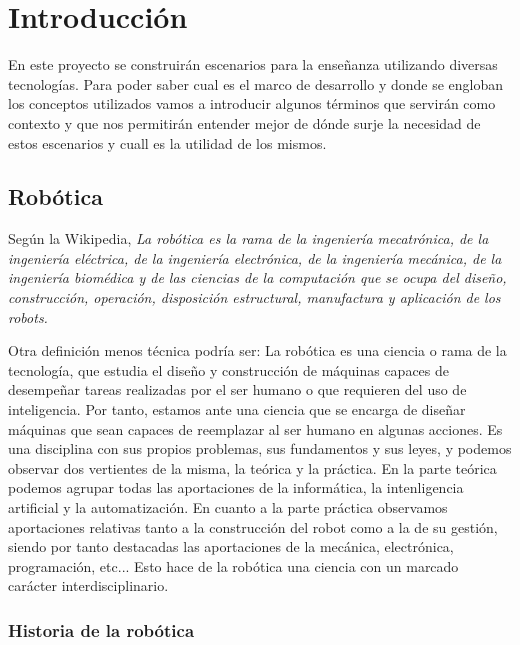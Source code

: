 \chapter{Introducción}
\label{ch:Introduccion}

En este proyecto se construirán escenarios para la enseñanza utilizando diversas tecnologías. Para poder saber cual es el marco de desarrollo y donde se engloban los conceptos utilizados vamos a introducir algunos términos que servirán como contexto y que nos permitirán entender mejor de dónde surje la necesidad de estos escenarios y cuall es la utilidad de los mismos.

\section{Robótica}
\label{sec:intr_robotica}

Según la Wikipedia\cite{wikipedia}, \textit{La robótica es la rama de la ingeniería mecatrónica, de la ingeniería eléctrica, de la ingeniería electrónica, de la ingeniería mecánica, de la ingeniería biomédica y de las ciencias de la computación que se ocupa del diseño, construcción, operación, disposición estructural, manufactura y aplicación de los robots.}

Otra definición menos técnica podría ser: La robótica es una ciencia o rama de la tecnología, que estudia el diseño y construcción de máquinas capaces de desempeñar tareas realizadas por el ser humano o que requieren del uso de inteligencia. Por tanto, estamos ante una ciencia que se encarga de diseñar máquinas que sean capaces de reemplazar al ser humano en algunas acciones. Es una disciplina con sus propios problemas, sus fundamentos y sus leyes, y podemos observar dos vertientes de la misma, la teórica y la práctica. En la parte teórica podemos agrupar todas las aportaciones de la informática, la intenligencia artificial y la automatización. En cuanto a la parte práctica observamos aportaciones relativas tanto a la construcción del robot como a la de su gestión, siendo por tanto destacadas las aportaciones de la mecánica, electrónica, programación, etc... Esto hace de la robótica una ciencia con un marcado carácter interdisciplinario.

\subsection{Historia de la robótica}
\label{subsec:intr_historiarobotica}

